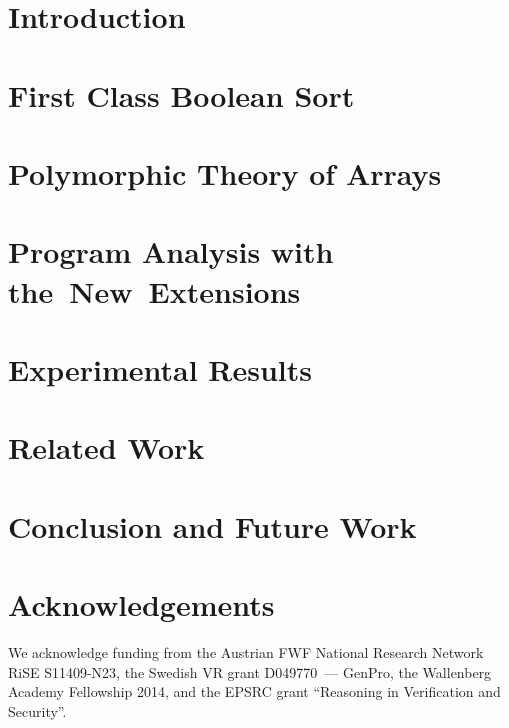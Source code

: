 \section{Introduction}
\label{sect:introduction}



\section{First Class Boolean Sort}
\label{sect:fool}



\section{Polymorphic Theory of Arrays}
\label{sect:arrays}



\section{Program Analysis with the~New~Extensions}
\label{sect:example}



\section{Experimental Results}
\label{sect:experiments}



\section{Related Work}
\label{sect:related}



\section{Conclusion and Future Work}
\label{sect:future}



\section*{Acknowledgements}
We acknowledge funding from the Austrian FWF National Research Network RiSE
S11409-N23, the Swedish VR grant D049770~--- GenPro, the
Wallenberg Academy Fellowship 2014, and the EPSRC grant ``Reasoning in Verification and Security''.